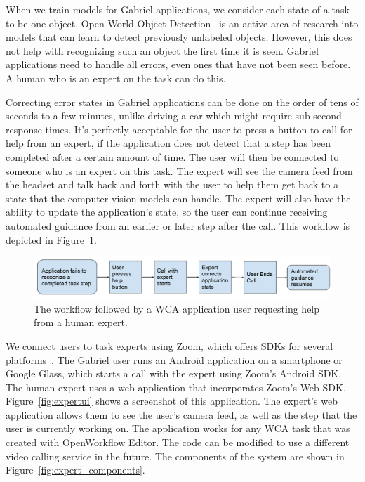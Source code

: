 When we train models for Gabriel applications, we consider each state of a task
to be one object. Open World Object Detection~\cite{joseph2021open} is an active
area of research into models that can learn to detect previously unlabeled
objects. However, this does not help with recognizing such an object the first
time it is seen. Gabriel applications need to handle all errors, even ones that
have not been seen before. A human who is an expert on the task can do this.

Correcting error states in Gabriel applications can be done on the order of tens
of seconds to a few
minutes, unlike driving a car which might require sub-second response times.
It's perfectly acceptable for the user to press a button to call for help from
an expert, if the application does not detect that a step has been completed
after a certain amount of time. The user will then be connected to someone who
is an expert on this task. The expert will
see the camera feed from the headset and talk back and forth with the user to
help them get back to a state that the computer vision models can handle.
The expert will also have the ability to update the application's state, so the
user can continue receiving automated guidance from an earlier or later
step after the call.
This workflow is depicted in Figure~\ref{fig:zoom_workflow}.

\begin{figure}[H]
  \includegraphics[width=\textwidth]{figures/zoom_workflow.pdf}
  \caption{The workflow followed by a WCA application user requesting help from
    a human expert.
  }\label{fig:zoom_workflow}
\end{figure}

We connect users to task experts using Zoom, which offers SDKs for several
platforms~\cite{Zoom}. The Gabriel user runs an Android application on a
smartphone or Google Glass, which starts a call with the expert using Zoom's
Android SDK.
The human expert uses a web application that incorporates Zoom's Web SDK.
Figure~\ref{fig:expertui} shows a screenshot of this application.
The expert's web application allows them to see the user's camera feed, as well
as the step that the user is currently working on.
The application works for any WCA task that was created with OpenWorkflow
Editor.
The code can be modified to use a different video calling service in the future.
The components of the system are shown in Figure~\ref{fig:expert_components}.

